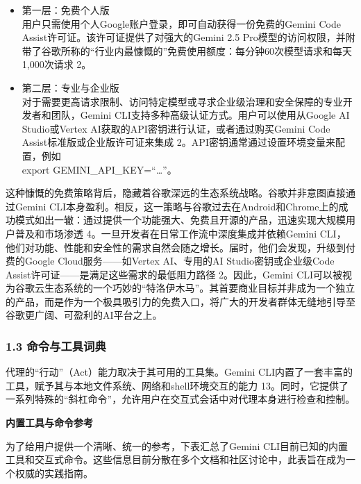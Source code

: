 \documentclass[a4paper,12pt]{article}
\providecommand{\tightlist}{%
  \setlength{\itemsep}{0pt}\setlength{\parskip}{0pt}}
\begin{document}
\begin{multicols}{2}
    \begin{itemize}
    \tightlist
    \item
      第一层：免费个人版\\
      用户只需使用个人Google账户登录，即可自动获得一份免费的Gemini Code
      Assist许可证。该许可证提供了对强大的Gemini 2.5
      Pro模型的访问权限，并附带了谷歌所称的``行业内最慷慨的''免费使用额度：每分钟60次模型请求和每天1,000次请求
      2。\\
    \item
      第二层：专业与企业版\\
      对于需要更高请求限制、访问特定模型或寻求企业级治理和安全保障的专业开发者和团队，Gemini
      CLI支持多种高级认证方式。用户可以使用从Google AI Studio或Vertex
      AI获取的API密钥进行认证，或者通过购买Gemini Code
      Assist标准版或企业版许可证来集成
      2。API密钥通常通过设置环境变量来配置，例如\\
      export GEMINI\_API\_KEY=``\ldots{}''。
    \end{itemize}

    这种慷慨的免费策略背后，隐藏着谷歌深远的生态系统战略。谷歌并非意图直接通过Gemini
    CLI本身盈利。相反，这一策略与谷歌过去在Android和Chrome上的成功模式如出一辙：通过提供一个功能强大、免费且开源的产品，迅速实现大规模用户普及和市场渗透
    4。一旦开发者在日常工作流中深度集成并依赖Gemini
    CLI，他们对功能、性能和安全性的需求自然会随之增长。届时，他们会发现，升级到付费的Google
    Cloud服务------如Vertex AI、专用的AI Studio密钥或企业级Code
    Assist许可证------是满足这些需求的最低阻力路径 2。因此，Gemini
    CLI可以被视为谷歌云生态系统的一个巧妙的``特洛伊木马''。其首要商业目标并非成为一个独立的产品，而是作为一个极具吸引力的免费入口，将广大的开发者群体无缝地引导至谷歌更广阔、可盈利的AI平台之上。

    \subsubsection{\texorpdfstring{\textbf{1.3
    命令与工具词典}}{1.3 命令与工具词典}}\label{ux547dux4ee4ux4e0eux5de5ux5177ux8bcdux5178}

    代理的``行动''（Act）能力取决于其可用的工具集。Gemini
    CLI内置了一套丰富的工具，赋予其与本地文件系统、网络和shell环境交互的能力
    13。同时，它提供了一系列特殊的``斜杠命令''，允许用户在交互式会话中对代理本身进行检查和控制。

    \textbf{内置工具与命令参考}

    为了给用户提供一个清晰、统一的参考，下表汇总了Gemini
    CLI目前已知的内置工具和交互式命令。这些信息目前分散在多个文档和社区讨论中，此表旨在成为一个权威的实践指南。


\end{multicols}
\end{document}
